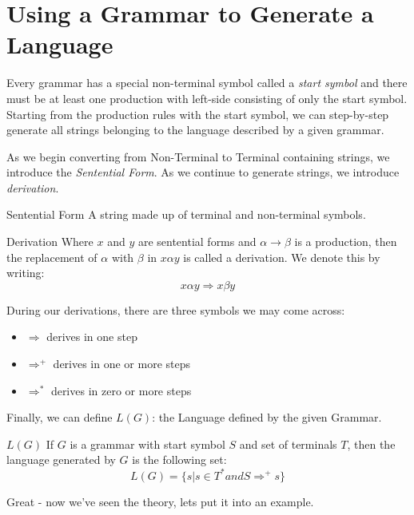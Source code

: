 \section{Using a Grammar to Generate a Language}
Every grammar has a special non-terminal symbol called a \textit{start symbol} and there must be at least one production with left-side consisting of only the start symbol. Starting from the production rules with the start symbol, we can step-by-step generate all strings belonging to the language described by a given grammar. 

As we begin converting from Non-Terminal to Terminal containing strings, we introduce the \textit{Sentential Form}. As we continue to generate strings, we introduce \textit{derivation}.
\begin{define}
    \item[Sentential Form] A string made up of terminal and non-terminal symbols.
    \item[Derivation] Where $x$ and $y$ are sentential forms and $\alpha \rightarrow \beta$ is a production, then the replacement of $\alpha$ with $\beta$ in $x \alpha y$ is called a derivation. We denote this by writing:
    \[ x \alpha y \Rightarrow x \beta y \]
\end{define}

During our derivations, there are three symbols we may come across:
\begin{itemize}
    \item $\Rightarrow$ derives in one step
    \item $\Rightarrow^+$ derives in one or more steps
    \item $\Rightarrow^*$ derives in zero or more steps
\end{itemize}

Finally, we can define $L(G)$: the Language defined by the given Grammar. 
\begin{define}
\item[$L(G)$] If $G$ is a grammar with start symbol $S$ and set of terminals $T$, then the language generated by $G$ is the following set:
\[L(G) = \{s | s \in T^* and S \Rightarrow^+ s\}\]
\end{define}

Great - now we've seen the theory, lets put it into an example.

